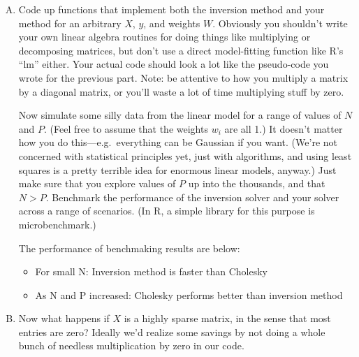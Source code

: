 \documentclass{article}
\begin{document}
\begin{enumerate}[(A)]
\color{black}

\item Code up functions that implement both the inversion method and your method for an arbitrary $X$, $y$, and weights $W$.  Obviously you shouldn't write your own linear algebra routines for doing things like multiplying or decomposing matrices, but don't use a direct model-fitting function like R's ``lm'' either.   Your actual code should look a lot like the pseudo-code you wrote for the previous part.  Note: be attentive to how you multiply a matrix by a diagonal matrix, or you'll waste a lot of time multiplying stuff by zero.







Now simulate some silly data from the linear model for a range of values of $N$ and $P$.  (Feel free to assume that the weights $w_i$ are all 1.)  It doesn't matter how you do this---e.g.~everything can be Gaussian if you want.  (We're not concerned with statistical principles yet, just with algorithms, and using least squares is a pretty terrible idea for enormous linear models, anyway.)  Just make sure that you explore values of $P$ up into the thousands, and that $N > P$.  Benchmark the performance of the inversion solver and your solver across a range of scenarios.  (In R, a simple library for this purpose is microbenchmark.)



\color{blue}



The performance of benchmaking results are below:



\begin{itemize}

\item For small N: Inversion method is faster than Cholesky

\item As N and P increased: Cholesky performs better than inversion method

\end{itemize}







\color{black}



\item Now what happens if $X$ is a highly sparse matrix, in the sense that most entries are zero?  Ideally we'd realize some savings by not doing a whole bunch of needless multiplication by zero in our code.








\end{enumerate}
\end{document}
